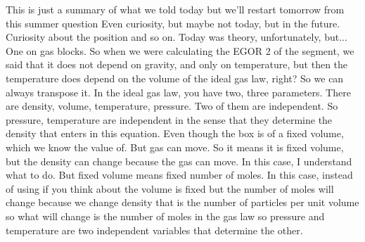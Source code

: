 This is just a summary of what we told today but we'll restart tomorrow from this summer question Even curiosity, but maybe not today, but in the future. Curiosity about the position and so on. Today was theory, unfortunately, but... One on gas blocks. So when we were calculating the EGOR 2 of the segment, we said that it does not depend on gravity, and only on temperature, but then the temperature does depend on the volume of the ideal gas law, right? So we can always transpose it. In the ideal gas law, you have two, three parameters. There are density, volume, temperature, pressure. Two of them are independent. So pressure, temperature are independent in the sense that they determine the density that enters in this equation. Even though the box is of a fixed volume, which we know the value of. But gas can move. So it means it is fixed volume, but the density can change because the gas can move. In this case, I understand what to do. But fixed volume means fixed number of moles. In this case, instead of using if you think about the volume is fixed but the number of moles will change because we change density that is the number of particles per unit volume so what will change is the number of moles in the gas law so pressure and temperature are two independent variables that determine the other.\\
